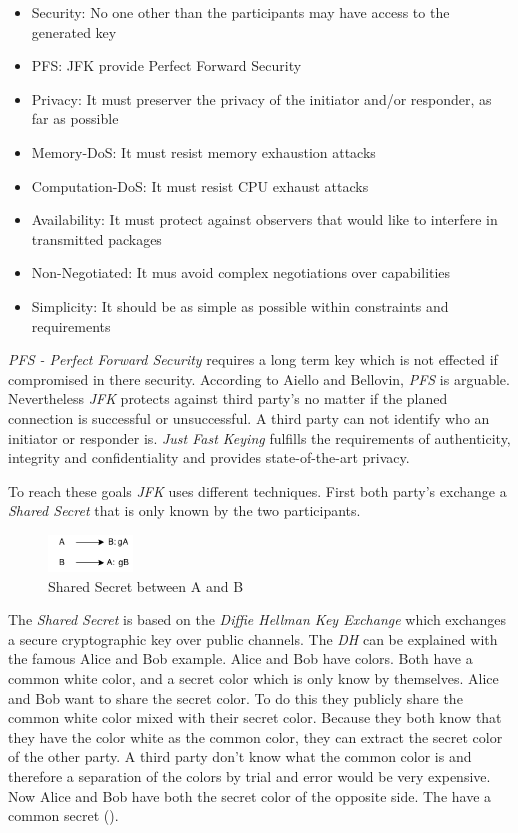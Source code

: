 \begin{itemize}
  \item Security: No one other than the participants may have access to the generated key
  \item PFS: JFK provide Perfect Forward Security
  \item Privacy: It must preserver the privacy of the initiator and/or responder, as far as possible
  \item Memory-DoS: It must resist memory exhaustion attacks
  \item Computation-DoS: It must resist CPU exhaust attacks
  \item Availability: It must protect against observers that would like to interfere in transmitted packages
  \item Non-Negotiated: It mus avoid complex negotiations over capabilities
  \item Simplicity: It should be as simple as possible within constraints and requirements
\end{itemize} \cite{canetti2002universally}

\textit{PFS - Perfect Forward Security} requires a long term key which is not effected if compromised in there security. According to Aiello and Bellovin, \textit{PFS} is arguable. Nevertheless \textit{JFK} protects against third party's no matter if the planed connection is successful or unsuccessful. A third party can not identify who an initiator or responder is. \textit{Just Fast Keying} fulfills the requirements of authenticity, integrity and confidentiality and provides state-of-the-art privacy. 

To reach these goals \textit{JFK} uses different techniques. First both party's exchange a \textit{Shared Secret} that is only known by the two participants.

\begin{figure}[h!]
  \centering
      \includegraphics[width=0.2\textwidth]{images/sharedsecret.png}
  \caption{Shared Secret between A and B}
\end{figure}

The \textit{Shared Secret} is based on the \textit{Diffie Hellman Key Exchange} which exchanges a secure cryptographic key over public channels. The \textit{DH} can be explained with the famous Alice and Bob example. Alice and Bob have colors. Both have a common white color, and a secret color which is only know by themselves. Alice and Bob want to share the secret color. To do this they publicly share the common white color mixed with their secret color. Because they both know that they have the color white as the common color, they can extract the secret color of the other party. A third party don't know what the common color is and therefore a separation of the colors by trial and error would be very expensive. Now Alice and Bob have both the secret color of the opposite side. The have a common secret (\cite{al2000diffie}).

